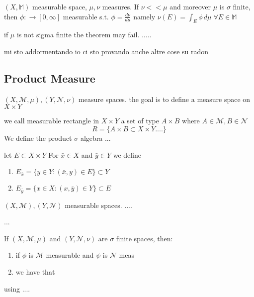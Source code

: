 \begin{theorem}
    \(\left(X, \mathbb{M}\right) \) measurable space, \(\mu, \nu\) measures. If \(\nu << \mu \) and moreover \(\mu \) is \(\sigma\) finite, then \(\phi : \to \left[0, \infty\right]\) measurable s.t.
    \(\phi = \frac{d \nu}{d \mu}\) namely \(\nu(E)= \int_E \phi \, d\mu \; \forall E \in \mathbb{M}\)
\end{theorem}

\begin{remark}
    if \(\mu\) is not sigma finite the theorem may fail.
    ..... 
\end{remark}

mi sto addormentando io ci sto provando anche
altre cose su radon 

\subsection*{Product Measure}
\( (X, \mathcal{M}, \mu), (Y, \mathcal{N}, \nu) \) measure spaces.
the goal is to define a measure space on \(X \times Y\)
\begin{definition}
    we call measurable rectangle in \(X \times Y\) a set of type \(A \times B\) where \(A \in \mathcal{M}, B \in \mathcal{N}\)
    \[  R = \{ A \times B \subset X\times Y ....\}\]
    We define the product \(\sigma\) algebra 
    ...
\end{definition}
\begin{definition}
    let \(E \subset X \times Y \) For \( \bar{x} \in X \) and \(\bar{y} \in Y \) we define
    \begin{enumerate}
        \item \( E_{\bar{x}} = \{ y \in Y: \left( \bar{x}, y \right) \in E \} \subset Y \)
        \item \( E_{\bar{y}} = \{ x \in X: \left( x, \bar{y} \right) \in Y \} \subset E \)
    \end{enumerate}
\end{definition}

\begin{proposition}
    \(\left( X, \mathcal{M} \right), \left( Y, \mathcal{N} \right)\) measurable spaces. 
    ....

\end{proposition}
...

\begin{theorem}
    If \(\left(X, \mathcal{M}, \mu \right)\) and \(\left(Y, \mathcal{N}, \nu \right)\) are \(\sigma\) finite spaces, then:
    \begin{enumerate}
        \item if \(\phi\) is \(\mathcal{M}\) measurable and \(\psi\) is \( \mathcal{N}\) meas
        \item we have that 
    \end{enumerate}

 \end{theorem}
using ....

